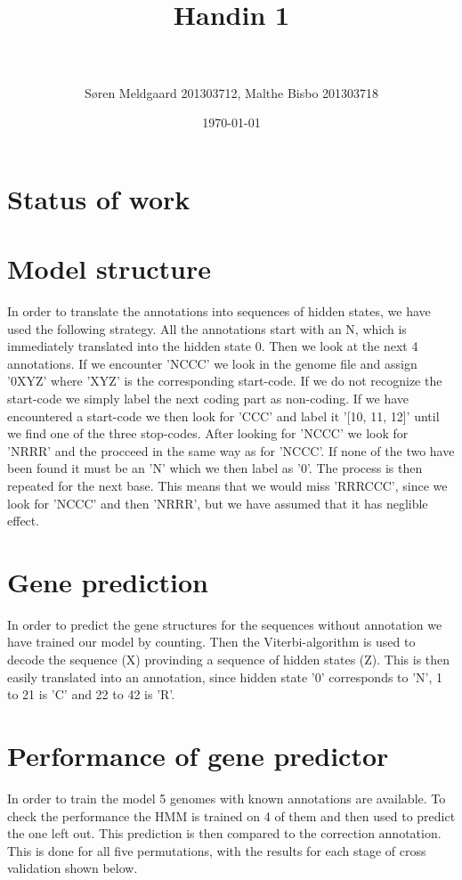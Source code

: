 \documentclass[paper=a4, fontsize=11pt]{scrartcl} %
\title{	
\normalfont \normalsize 
\horrule{0.5pt} \\[0.4cm] %
\huge Handin 1 \\ %
\horrule{2pt} \\[0.5cm] %
}
\author{S\o ren Meldgaard 201303712, Malthe Bisbo 201303718} %
\date{\normalsize\today} %
\numberwithin{equation}{section} %
\numberwithin{figure}{section} %
\numberwithin{table}{section} %
\begin{document}
\maketitle %

\section{Status of work}

\section{Model structure}

In order to translate the annotations into sequences of hidden states, we have used the following strategy.
All the annotations start with an N, which is immediately translated into the hidden state 0. Then we look at the next 4 annotations. If we encounter 'NCCC' we look in the genome file and assign '0XYZ' where 'XYZ' is the corresponding start-code. If we do not recognize the start-code we simply label the next coding part as non-coding. If we have encountered a start-code we then look for 'CCC' and label it '[10, 11, 12]' until we find one of the three stop-codes. After looking for 'NCCC' we look for 'NRRR' and the procceed in the same way as for 'NCCC'. If none of the two have been found it must be an 'N' which we then label as '0'. The process is then repeated for the next base. This means that we would miss 'RRRCCC', since we look for 'NCCC' and then 'NRRR', but we have assumed that it has neglible effect.

\section{Gene prediction}
In order to predict the gene structures for the sequences without annotation we have trained our model by counting. Then the Viterbi-algorithm is used to decode the sequence (X) provinding a sequence of hidden states (Z). This is then easily translated into an annotation, since hidden state '0' corresponds to 'N', 1 to 21 is 'C' and 22 to 42 is 'R'.

\section{Performance of gene predictor}
In order to train the model 5 genomes with known annotations are available. To check the performance the HMM is trained on 4 of them and then used to predict the one left out. This prediction is then compared to the correction annotation. This is done for all five permutations, with the results for each stage of cross validation shown below. \\
\end{document}

